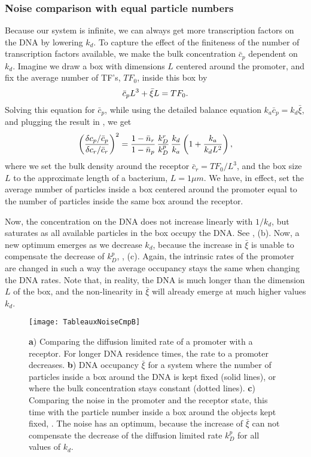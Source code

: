 \subsubsection{Noise comparison with equal particle numbers}
Because our system is infinite, we can always get more transcription factors on the DNA by lowering $k_d$. To capture the effect of the finiteness of the number of transcription factors available, we make the bulk concentration $\bar{c}_p$ dependent on $k_d$. Imagine we draw a box with dimensions $L$ centered around the promoter, and fix the average number of TF's, $TF_0$, inside this box by
\begin{equation}
 \bar{c}_p L^3 + \bar{\xi} L = TF_0.
  \elabel{RecCmpFix}
\end{equation}
Solving this equation for $\bar{c}_p$, while using the detailed balance equation $k_a \bar{c}_p = k_d \bar{\xi}$, and plugging the result in , we get
\begin{equation}
 \left( \frac{\delta c_p / \bar{c}_p}{\delta c_r / \bar{c}_r} \right)^2 = \frac{1-\bar{n}_r}{1-\bar{n}_p} \, \frac{k_D^r}{k_D^p} \, \frac{k_d}{k_a} \left( 1 + \frac{k_a}{k_d L^2}\right),
 \elabel{NoiseCmpB}
\end{equation}
where we set the bulk density around the receptor $\bar{c}_r = TF_0/L^3$, and the box size $L$ to the approximate length of a bacterium, $L=1\mu m$. We have, in effect, set the average number of particles inside a box centered around the promoter equal to the number of particles inside the same box around the receptor. 

Now, the concentration on the DNA does not increase linearly with $1/k_d$, but saturates as all available particles in the box occupy the DNA. See , (b). Now, a new optimum emerges as we decrease $k_d$, because the increase in $\bar{\xi}$ is unable to compensate the decrease of $k_D^p$, , (c). Again, the intrinsic rates of the promoter are changed in such a way the average occupancy stays the same when changing the DNA rates. Note that, in reality, the DNA is much longer than the dimension $L$ of the box, and the non-linearity in $\bar{\xi}$ will already emerge at much higher values $k_d$. 

\begin{figure}[hb!]
\centering
\texttt{[image: TableauxNoiseCmpB]}
\caption{ {\bf a}) Comparing the diffusion limited rate of a promoter with a receptor. For longer DNA residence times, the rate to a promoter decreases. {\bf b}) DNA occupancy $\bar{\xi}$ for a system where the number of particles inside a box around the DNA is kept fixed (solid lines), or where the bulk concentration stays constant (dotted lines). {\bf c}) Comparing the noise in the promoter and the receptor state, this time with the particle number inside a box around the objects kept fixed, . The noise has an optimum, because the increase of $\bar{\xi}$ can not compensate the decrease of the diffusion limited rate $k_D^p$ for all values of $k_d$. 
}
\end{figure}


